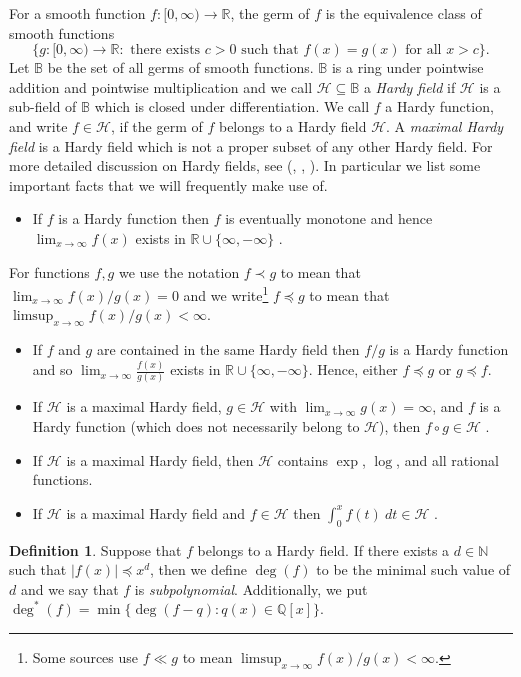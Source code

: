 \documentclass[12pt]{article}
\theoremstyle{plain} %
\theoremstyle{definition} %
\newtheorem{definition}[theorem]{Definition}
\theoremstyle{plain}
\theoremstyle{plain}
\numberwithin{equation}{section}
\newcommand{\N}{\mathbb{N}}
\newcommand{\R}{\mathbb{R}}
\newcommand{\Q}{\mathbb{Q}}
\renewcommand{\subset}{\subseteq}
\newcommand{\1}{\mathbbm{1}}
\newcommand{\oo}{\infty}
\begin{document}
    For a smooth function $f:[0,\oo)\rightarrow \R$, the germ of $f$ is the equivalence class of smooth functions 
    $$
    \{g:[0,\oo)\rightarrow \R: \text{ there exists } c>0 \text{ such that } f(x)=g(x) \text{ for all }x>c\}.
    $$
    Let $\mathbb{B}$ be the set of all germs of smooth functions. $\mathbb{B}$ is a ring under pointwise addition and pointwise multiplication and we call $\mathcal{H}\subset \mathbb{B}$ a \emph{Hardy field} if $\mathcal{H}$ is a sub-field of $\mathbb{B}$ which is closed under differentiation. We call $f$ a Hardy function, and write $f\in \mathcal{H}$, if the germ of $f$ belongs to a Hardy field $\mathcal{H}$. A \emph{maximal Hardy field} is a Hardy field which is not a proper subset of any other Hardy field. For more detailed discussion on Hardy fields, see (\cite{Boshernitzan81}, \cite{Boshernitzan}, \cite{Fran09}). In particular we list some important facts that we will frequently make use of.
\begin{itemize}
    \item If $f$ is a Hardy function then $f$ is eventually monotone and hence $\lim_{x\to\oo}f(x)$ exists in $\R\cup\{\oo,-\oo\}$ \cite[Section 1.1]{FW09}.
\end{itemize}
 For functions $f,g$ we use the notation $f\prec g$ to mean that $\lim_{x\to\oo}f(x)/g(x)=0$ and we write\footnote{Some sources use $f \ll g$ to mean $\limsup_{x\to\oo}{f(x)}/{g(x)}<\oo$.} $f\preceq g$ to mean that $\limsup_{x\to\oo}f(x)/g(x)<\oo$.
 \begin{itemize}
    \item If $f$ and $g$ are contained in the same Hardy field then $f/g$ is a Hardy function and so $\lim_{x\to\oo}\frac{f(x)}{g(x)}$ exists in $\R\cup \{\oo,-\oo\}$. Hence, either $f\preceq g$ or $g\preceq f$.
    \item If $\mathcal{H}$ is a maximal Hardy field, $g\in \mathcal{H}$ with $\lim_{x\to\oo}g(x)=\oo$, and $f$ is a Hardy function (which does not necessarily belong to $\mathcal{H}$), then $f\circ g\in \mathcal{H}$ \cite[Proposition 6.9]{Boshernitzan81}.
    \item If $\mathcal{H}$ is a maximal Hardy field, then $\mathcal{H}$ contains $\exp$, $\log$, and all rational functions.
    \item If $\mathcal{H}$ is a maximal Hardy field and $f\in \mathcal{H}$ then $\int_0^xf(t)~dt\in \mathcal{H}$ \cite[Theorem 5.3]{Boshernitzan81}.
\end{itemize}
\begin{definition}\label{def:degree}
    Suppose that $f$ belongs to a Hardy field. 
    If there exists a $d\in \N$ such that $|f(x)|\preceq x^{d}$, then we define $\deg(f)$ to be the minimal such value of $d$ and we say that $f$ is \emph{subpolynomial}.
    Additionally, we put $\deg^*(f) = \min\{\deg(f-q):q(x)\in \Q[x]\}$.
\end{definition}
\end{document}
